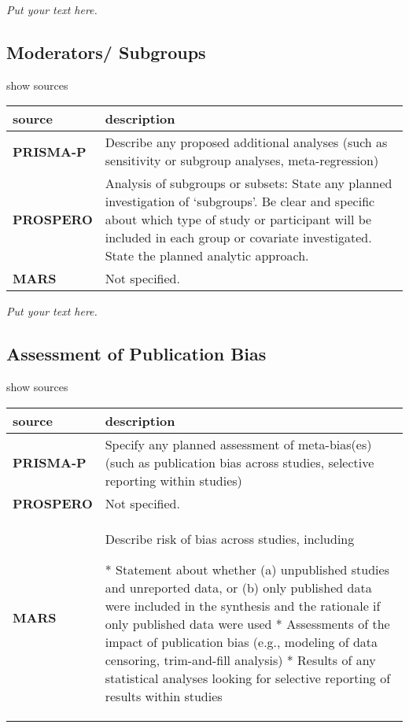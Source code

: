 \documentclass[]{article}
\begin{document}
\emph{Put your text here.}

\hypertarget{moderators-subgroups}{%
\subsection{Moderators/ Subgroups}\label{moderators-subgroups}}

show sources

\hypertarget{modarat}{}
\begin{table}[H]
\centering
\begin{tabular}{>{\bfseries}l|l}
\hline
\rowcolor[HTML]{ececec}  source & description\\
\hline
PRISMA-P & Describe any proposed additional analyses (such as sensitivity or subgroup analyses, meta-regression)\\
\hline
PROSPERO & Analysis of subgroups or subsets: State any planned investigation of ‘subgroups’. Be clear and specific about which type of study or participant will be included in each group or covariate investigated. State the planned analytic approach.\\
\hline
MARS & Not specified.\\
\hline
\end{tabular}
\end{table}

\emph{Put your text here.}

\hypertarget{assessment-of-publication-bias}{%
\subsection{Assessment of Publication
Bias}\label{assessment-of-publication-bias}}

show sources

\hypertarget{aopb}{}
\begin{table}[H]
\centering
\begin{tabular}{>{\bfseries}l|l}
\hline
\rowcolor[HTML]{ececec}  source & description\\
\hline
PRISMA-P & Specify any planned assessment of meta-bias(es) (such as publication bias across studies, selective reporting within studies)\\
\hline
PROSPERO & Not specified.\\
\hline
MARS & Describe risk of bias across studies, including

* Statement about whether
   (a) unpublished studies and unreported data, or 
   (b) only published data were included in the synthesis and the rationale if only published data were used
* Assessments of the impact of publication bias (e.g., modeling of data censoring, trim-and-fill analysis)
* Results of any statistical analyses looking for selective reporting of results within studies\\
\hline
\end{tabular}
\end{table}
\end{document}
